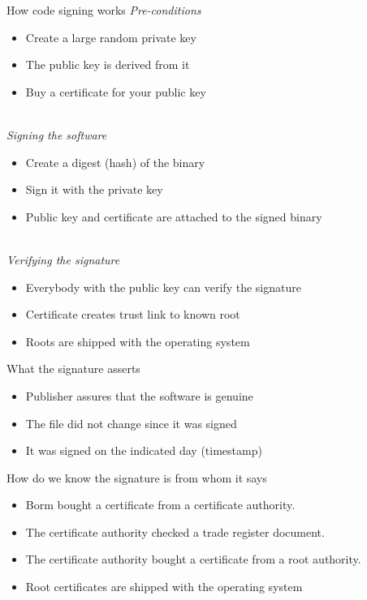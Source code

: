 \documentclass[11pt]{beamer}
\begin{document}
\begin{frame}{How code signing works}
\emph{Pre-conditions}
\begin{itemize}
\item Create a large random private key
\item The public key is derived from it
\item Buy a certificate for your public key
\end{itemize}
\pause
\\[0.2cm]
\emph{Signing the software}
\begin{itemize}
\item Create a digest (hash) of the binary
\item Sign it with the private key
\item Public key and certificate are attached to the signed binary
\end{itemize}
\pause
\\[0.2cm]
\emph{Verifying the signature}
\begin{itemize}
\item Everybody with the public key can verify the signature
\item Certificate creates trust link to known root
\item Roots are shipped with the operating system
\end{itemize}
\end{frame}

\begin{frame}{What the signature asserts}
\begin{itemize}
\item Publisher assures that the software is genuine
\item The file did not change since it was signed
\item It was signed on the indicated day (timestamp)
\end{itemize}
\end{frame}

\begin{frame}{How do we know the signature is from whom it says}
\begin{itemize}
\item Borm bought a certificate from a certificate authority.
\item The certificate authority checked a trade register document.
\item The certificate authority bought a certificate from a root authority.
\item Root certificates are shipped with the operating system
\end{itemize}
\end{frame}
\end{document}
